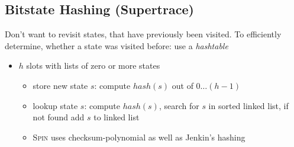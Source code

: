 \documentclass[a4paper, 10pt]{article}
\begin{document}
\subsection{Bitstate Hashing (Supertrace)}
\begin{minipage}[]{0.48\textwidth}
Don't want to revisit states, that have previously been visited. To efficiently determine, whether a state was visited before: use a \emph{hashtable}
\begin{itemize}
    \item $h$ slots with lists of zero or more states
    \begin{itemize}
        \item store new state $s$: compute $hash(s)$ out of $0\dots (h-1)$
        \item lookup state $s$: compute $hash(s)$, search for $s$ in sorted linked list, if not found add $s$ to linked list
    \end{itemize}
    \begin{itemize}
        \item \textsc{Spin} uses checksum-polynomial as well as Jenkin's hashing
    \end{itemize}
\end{itemize}
\end{minipage}
\begin{minipage}[]{0.48\textwidth}
\begin{center}
\scalebox{.8}{}
\end{center}
\end{minipage}
\end{document}
